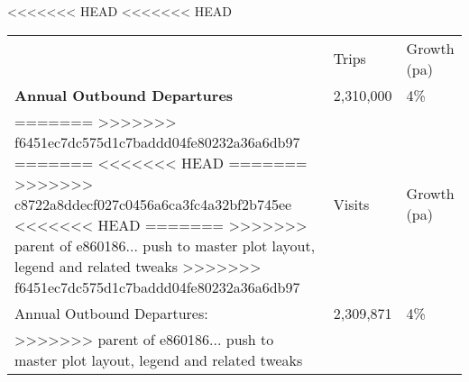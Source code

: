 <<<<<<< HEAD
<<<<<<< HEAD
\begin{tabular}[t]{p{4.7cm}>{\hfill}p{1.1cm}>{\hfill}p{1.7cm}}
   & Trips & Growth (pa) \\ 
 \textbf{Annual Outbound Departures} & 2,310,000 & 4\% \\ 
=======
>>>>>>> f6451ec7dc575d1c7baddd04fe80232a36a6db97
=======
<<<<<<< HEAD
=======
>>>>>>> c8722a8ddecf027c0456a6ca3fc4a32bf2b745ee
<<<<<<< HEAD
=======
>>>>>>> parent of e860186... push to master plot layout, legend and related tweaks
>>>>>>> f6451ec7dc575d1c7baddd04fe80232a36a6db97
\begin{tabular}[t]{p{4.8cm}>{\hfill}p{1.3cm}>{\hfill}p{1.4cm}}
   & Visits & Growth (pa) \\ 
 Annual Outbound Departures: & 2,309,871 & 4\% \\ 
>>>>>>> parent of e860186... push to master plot layout, legend and related tweaks
  \end{tabular}

